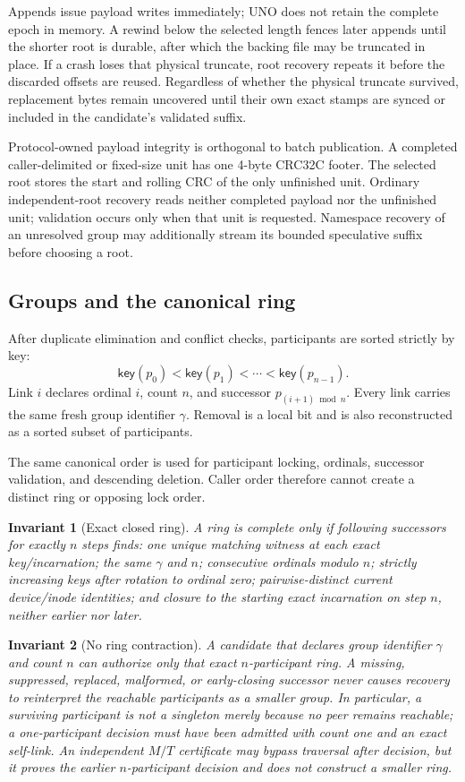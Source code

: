 \documentclass[10pt,twocolumn]{article}
\newtheorem{invariant}{Invariant}
\theoremstyle{remark}
\newcommand{\keyof}{\mathsf{key}}
\newcommand{\gid}{\gamma}
\begin{document}
Appends issue payload writes immediately; UNO does not retain the complete epoch in memory. A
rewind below the selected length fences later appends until the shorter root is durable, after
which the backing file may be truncated in place. If a crash loses that physical truncate, root
recovery repeats it before the discarded offsets are reused. Regardless of whether the physical
truncate survived, replacement bytes remain uncovered until their own exact stamps are synced or
included in the candidate's validated suffix.

Protocol-owned payload integrity is orthogonal to batch publication. A completed caller-delimited
or fixed-size unit has one 4-byte CRC32C footer. The selected root stores the start and rolling CRC
of the only unfinished unit. Ordinary independent-root recovery reads neither completed payload nor
the unfinished unit; validation occurs only when that unit is requested. Namespace recovery of an
unresolved group may additionally stream its bounded speculative suffix before choosing a root.

\subsection{Groups and the canonical ring}

After duplicate elimination and conflict checks, participants are sorted strictly by key:
\[
  \keyof(p_0)<\keyof(p_1)<\cdots<\keyof(p_{n-1}).
\]
Link $i$ declares ordinal $i$, count $n$, and successor
$p_{(i+1)\bmod n}$. Every link carries the same fresh group identifier $\gid$. Removal is a local
bit and is also reconstructed as a sorted subset of participants.

The same canonical order is used for participant locking, ordinals, successor validation, and
descending deletion. Caller order therefore cannot create a distinct ring or opposing lock order.

\begin{invariant}[Exact closed ring]\label{i:ring}
A ring is complete only if following successors for exactly $n$ steps finds: one unique matching
witness at each exact key/incarnation; the same $\gid$ and $n$; consecutive ordinals modulo $n$;
strictly increasing keys after rotation to ordinal zero; pairwise-distinct current device/inode
identities; and closure to the starting exact incarnation on step $n$, neither earlier nor later.
\end{invariant}

\begin{invariant}[No ring contraction]\label{i:nocontraction}
A candidate that declares group identifier $\gid$ and count $n$ can authorize only that exact
$n$-participant ring. A missing, suppressed, replaced, malformed, or early-closing successor never
causes recovery to reinterpret the reachable participants as a smaller group. In particular, a
surviving participant is not a singleton merely because no peer remains reachable; a one-participant
decision must have been admitted with count one and an exact self-link. An independent $M/T$
certificate may bypass traversal after decision, but it proves the earlier $n$-participant decision
and does not construct a smaller ring.
\end{invariant}
\end{document}
